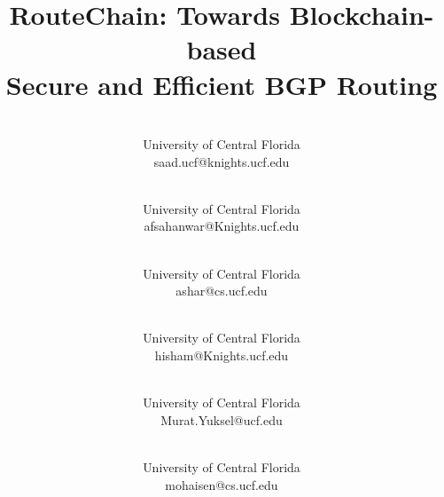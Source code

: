 \documentclass[conference]{IEEEtran}
\begin{document}
\title{RouteChain: Towards Blockchain-based \\Secure and Efficient BGP Routing}



\author{%
  \\University of Central Florida\\ saad.ucf@knights.ucf.edu \\
  \and {}\\University of Central Florida\\ afsahanwar@Knights.ucf.edu \\
  \and {}\\University of Central Florida\\ ashar@cs.ucf.edu \\
  \and {}\\University of Central Florida\\ hisham@Knights.ucf.edu \\

\and {}\\University of Central Florida\\ Murat.Yuksel@ucf.edu \\

\and {}\\University of Central Florida\\ mohaisen@cs.ucf.edu \\


  
}

\IEEEoverridecommandlockouts
{}

\maketitle

\IEEEpubidadjcol
\end{document}
